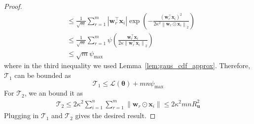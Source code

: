 \documentclass[10pt]{article} %
\theoremstyle{definition}
\theoremstyle{plain}
\newcommand{\paren}[1]{\left(#1\right)}
\newcommand{\norm}[1]{\left\|#1\right\|}
\def\calL{{\mathcal{L}}}
\def\bfu{{\mathbf{u}}}\def\bfv{{\mathbf{v}}}\def\bfw{{\mathbf{w}}}\def\bfx{{\mathbf{x}}}
\begin{document}
\begin{proof}
\begin{align*}
        & \leq \frac{1}{\sqrt{m}}\sum_{r=1}^m\left|\bfw_r^\top\bfx_i\right|\exp\paren{-\frac{\paren{\bfw_r^\top\bfx_i}^2}{2\kappa^2\norm{\bfw_r\odot\bfx_i}_2}}\\
        & \leq \frac{1}{\sqrt{m}}\sum_{r=1}^m\psi\paren{\frac{\bfw_r^\top\bfx_i}{2\kappa\norm{\bfw_r^\top\bfx_i}_2}}\\
        & \leq \sqrt{m}\psi_{\max}
    \end{align*}
    where in the third inequality we used Lemma~\ref{lem:gaus_cdf_approx}. Therefore, $\mathcal{T}_1$ can be bounded as
    \[
        \mathcal{T}_1 \leq \calL\paren{\bm{\theta}} +mn\psi_{\max}
    \]
    For $\mathcal{T}_2$, we an bound it as
    \begin{align*}
        \mathcal{T}_2 \leq 2\kappa^2\sum_{i=1}^n\sum_{r=1}^m\norm{\bfw_r\odot\bfx_i} \leq 2\kappa^2mnR_{\bfu}^2
    \end{align*}
    Plugging in $\mathcal{T}_1$ and $\mathcal{T}_2$ gives the desired result.
\end{proof}
\end{document}
